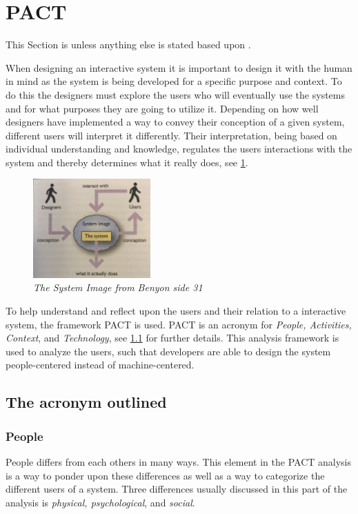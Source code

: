 \section{PACT}\label{sec:PACT}
This Section is unless anything else is stated based upon \cite{Benyon}.

When designing an interactive system it is important to design it with the human in mind as the system is being developed for a specific purpose and context.
To do this the designers must explore the users who will eventually use the systems and for what purposes they are going to utilize it. 
Depending on how well designers have implemented a way to convey their conception of a given system, different users will interpret it differently. 
Their interpretation, being based on individual understanding and knowledge, regulates the users interactions with the system and thereby determines what it really does, see \cref{fig:PACT-SystemImage}.

\begin{figure}[H]
	\centering
	\includegraphics[width=0.4\textwidth]{billeder/SystemImage-Benyon.png}
	\caption{\textit{The System Image from {\color{red}Benyon side 31}}}
	\label{fig:PACT-SystemImage}
\end{figure}

To help understand and reflect upon the users and their relation to a interactive system, the framework PACT is used. 
PACT is an acronym for \textit{People, Activities, Context}, and \textit{Technology}, see \cref{sec:PACT-method} for further details.
This analysis framework is used to analyze the users, such that developers are able to design the system people-centered instead of machine-centered.

\subsection{The acronym outlined}\label{sec:PACT-method}
\subsubsection{People}
People differs from each others in many ways.
This element in the PACT analysis is a way to ponder upon these differences as well as a way to categorize the different users of a system. 
Three differences usually discussed in this part of the analysis is \textit{physical, psychological}, and \textit{social}.

